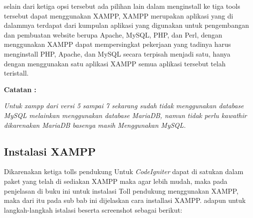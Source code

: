 selain dari ketiga opsi tersebut ada pilihan lain dalam menginstall ke tiga tools tersebut dapat menggunakan XAMPP, XAMPP merupakan aplikasi yang di dalammya terdapat dari kumpulan aplikasi yang digunakan untuk pengembangan dan pembuatan website berupa Apache, MySQL, PHP, dan Perl, dengan menggunakan XAMPP dapat mempersingkat pekerjaan yang tadinya harus menginstall PHP, Apache, dan MySQL secara terpisah menjadi satu, hanya dengan menggunakan satu aplikasi XAMPP semua aplikasi tersebut telah teristall. 

\textbf{Catatan :}\par
\textit{Untuk xampp dari versi 5 sampai 7 sekarang sudah tidak menggunakan database MySQL melainkan menggunakan database MariaDB, namun tidak perlu kawathir dikarenakan MariaDB basenya masih Menggunakan MySQL.}\pagebreak

\subsection{Instalasi XAMPP}
Dikarenakan ketiga tolls pendukung Untuk \textit{CodeIgniter} dapat di satukan dalam paket yang telah di sediakan XAMPP maka agar lebih mudah, maka pada penjelasan di buku ini untuk instalasi Toll pendukung menggunakan XAMPP, maka dari itu pada sub bab ini dijelaskan cara installasi XAMPP. adapun untuk langkah-langkah istalasi beserta screenshot sebagai berikut:

